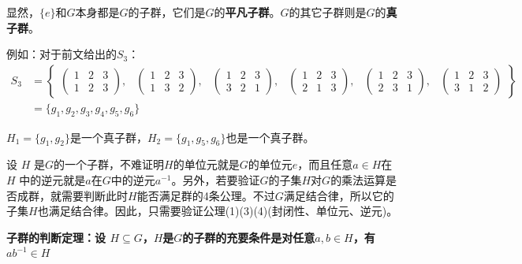 \documentclass[12pt]{article}
\begin{document}
显然，$\{e\}$和$G$本身都是$G$的子群，它们是$G$的\textbf{平凡子群}。$G$的其它子群则是$G$的\textbf{真子群}。

\begin{framed}
\small {
例如：对于前文给出的$S_3$：
\begin{align*}
S_3 &= \begin{Bmatrix}
\begin{pmatrix}
1 & 2 & 3\\
1 & 2 & 3
\end{pmatrix}, &
\begin{pmatrix}
1 & 2 & 3\\
1 & 3 & 2
\end{pmatrix}, &
\begin{pmatrix}
1 & 2 & 3\\
3 & 2 & 1
\end{pmatrix}, &
\begin{pmatrix}
1 & 2 & 3\\
2 & 1 & 3
\end{pmatrix}, &
\begin{pmatrix}
1 & 2 & 3\\
2 & 3 & 1
\end{pmatrix}, &
\begin{pmatrix}
1 & 2 & 3\\
3 & 1 & 2
\end{pmatrix}
\end{Bmatrix}  \\
&= \{g_1, g_2, g_3, g_4, g_5, g_6\}
\end{align*}

$H_1 = \{g_1, g_2\}$是一个真子群，$H_2=\{g_1, g_5, g_6\}$也是一个真子群。
}
\end{framed}

设 $H$ 是$G$的一个子群，不难证明$H$的单位元就是$G$的单位元$e$，而且任意$a\in H$在 $H$ 中的逆元就是$a$在$G$中的逆元$a^{-1}$。另外，若要验证$G$的子集$H$对$G$的乘法运算是否成群，就需要判断此时$H$能否满足群的4条公理。不过$G$满足结合律，所以它的子集$H$也满足结合律。因此，只需要验证公理(1)(3)(4)(封闭性、单位元、逆元)。

\begin{mdframed}[
linecolor=black!40,outerlinewidth=1pt,roundcorner=.5em,innertopmargin=1ex,innerbottommargin=.5\baselineskip,innerrightmargin=1em,innerleftmargin=1em,backgroundcolor=gray!5,
]
\textbf{
子群的判断定理：设 $H \subseteq G$，$H$是$G$的子群的充要条件是对任意$a, b \in H$，有$ab^{-1} \in H$
}
\end{mdframed}
\end{document}
